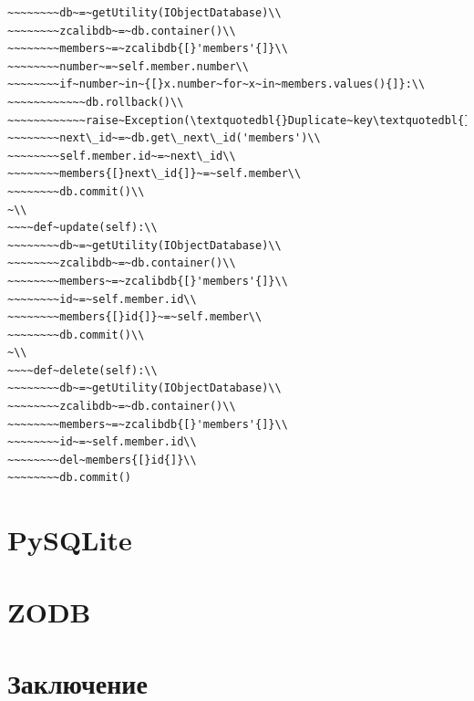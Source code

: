 \documentclass[a4paper,openany,twoside,draft]{book}
\begin{document}
\begin{verbatim}
~~~~~~~~db~=~getUtility(IObjectDatabase)\\
~~~~~~~~zcalibdb~=~db.container()\\
~~~~~~~~members~=~zcalibdb{[}'members'{]}\\
~~~~~~~~number~=~self.member.number\\
~~~~~~~~if~number~in~{[}x.number~for~x~in~members.values(){]}:\\
~~~~~~~~~~~~db.rollback()\\
~~~~~~~~~~~~raise~Exception(\textquotedbl{}Duplicate~key\textquotedbl{})\\
~~~~~~~~next\_id~=~db.get\_next\_id('members')\\
~~~~~~~~self.member.id~=~next\_id\\
~~~~~~~~members{[}next\_id{]}~=~self.member\\
~~~~~~~~db.commit()\\
~\\
~~~~def~update(self):\\
~~~~~~~~db~=~getUtility(IObjectDatabase)\\
~~~~~~~~zcalibdb~=~db.container()\\
~~~~~~~~members~=~zcalibdb{[}'members'{]}\\
~~~~~~~~id~=~self.member.id\\
~~~~~~~~members{[}id{]}~=~self.member\\
~~~~~~~~db.commit()\\
~\\
~~~~def~delete(self):\\
~~~~~~~~db~=~getUtility(IObjectDatabase)\\
~~~~~~~~zcalibdb~=~db.container()\\
~~~~~~~~members~=~zcalibdb{[}'members'{]}\\
~~~~~~~~id~=~self.member.id\\
~~~~~~~~del~members{[}id{]}\\
~~~~~~~~db.commit()
\end{verbatim}


\section{PySQLite%
  \label{pysqlite}%
}


\section{ZODB%
  \label{zodb}%
}

\newpage{}
\section{Заключение%
  \label{id53}%
}
\end{document}
